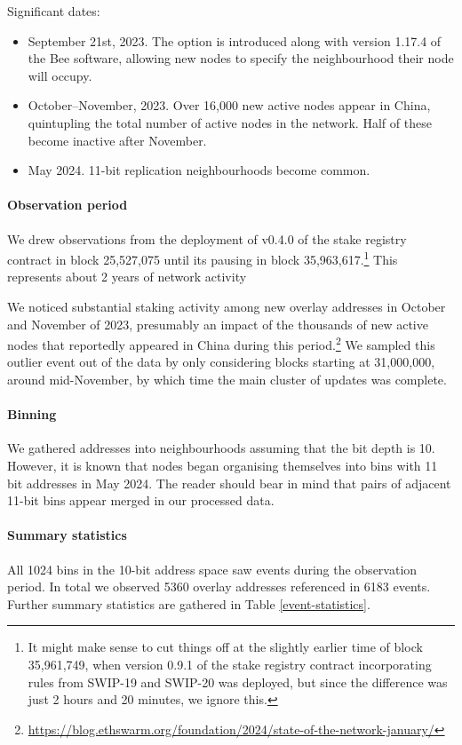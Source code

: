 Significant dates:
\begin{itemize}
  \item September 21st, 2023. The  option is introduced along with version 1.17.4 of the Bee software, allowing new nodes to specify the neighbourhood their node will occupy.
  \item October--November, 2023. Over 16,000 new active nodes appear in China, quintupling the total number of active nodes in the network. Half of these become inactive after November.
  \item May 2024. 11-bit replication neighbourhoods become common.
\end{itemize}

\paragraph{Observation period}
We drew observations from the deployment of v0.4.0 of the stake registry contract in block 25,527,075 until its pausing in block 35,963,617.\footnote{It might make sense to cut things off at the slightly earlier time of block 35,961,749, when version 0.9.1 of the stake registry contract incorporating rules from SWIP-19 and SWIP-20 was deployed, but since the difference was just 2 hours and 20 minutes, we ignore this.} This represents about 2 years of network activity

We noticed substantial staking activity among new overlay addresses in October and November of 2023, presumably an impact of the thousands of new active nodes that reportedly appeared in China during this period.\footnote{\url{https://blog.ethswarm.org/foundation/2024/state-of-the-network-january/}}
%
We sampled this outlier event out of the data by only considering blocks starting at 31,000,000, around mid-November, by which time the main cluster of updates was complete.

\paragraph{Binning} We gathered addresses into neighbourhoods assuming that the bit depth is 10.
%
However, it is known that nodes began organising themselves into bins with 11 bit addresses in May 2024.
%
The reader should bear in mind that pairs of adjacent 11-bit bins appear merged in our processed data.

\paragraph{Summary statistics}
All 1024 bins in the 10-bit address space saw events during the observation period.
%
In total we observed 5360 overlay addresses referenced in 6183 events. 
%
Further summary statistics are gathered in Table \ref{event-statistics}.

